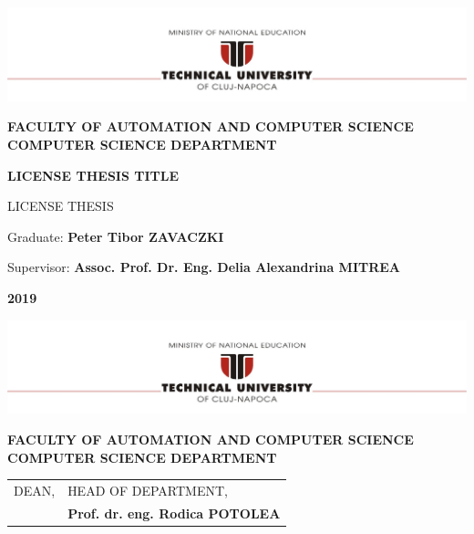 \documentclass[12pt,a4paper,twoside]{report}
\renewcommand{\thesisauthor}{Peter Tibor ZAVACZKI}    %
\renewcommand{\thesisyear}{2019}      %
\renewcommand{\thesistitle}{LICENSE THESIS TITLE}
\renewcommand{\thesissupervisor}{Assoc. Prof. Dr. Eng. Delia Alexandrina MITREA}
\newcommand{\department}{\bf FACULTY OF AUTOMATION AND COMPUTER SCIENCE\\
COMPUTER SCIENCE DEPARTMENT}
\newcommand{\thesis}{LICENSE THESIS}
\newcommand{\utcnlogo}{\includegraphics[width=15cm]{img/tucn.jpg}}
\begin{document}

\newenvironment{definition}[1][Defini\c{t}ie.]{\begin{trivlist}
\item[\hskip \labelsep {\bfseries #1}]}{\end{trivlist}}




\setcounter{secnumdepth}{3}

\setcounter{page}{1}



\begin{center}
\utcnlogo

\department

\vspace{4cm}

{\bf \thesistitle} %

\vspace{1.5cm}

\thesis

\vspace{6cm}

Graduate: {\bf \thesisauthor} 

Supervisor: {\bf \thesissupervisor}

\vspace{3cm}
{\bf \thesisyear}
\end{center}

\thispagestyle{empty}
\newpage

\begin{center}
\utcnlogo

\department

\end{center}
\vspace{0.5cm}

\begin{tabular}{p{7cm}p{8cm}}
 \hspace{-1cm}DEAN, & HEAD OF DEPARTMENT,\\
 \hspace{-1cm}{\bf Prof. dr. eng. Liviu MICLEA} & {\bf Prof. dr. eng. Rodica POTOLEA}\\  
\end{tabular}
 
\end{document}
